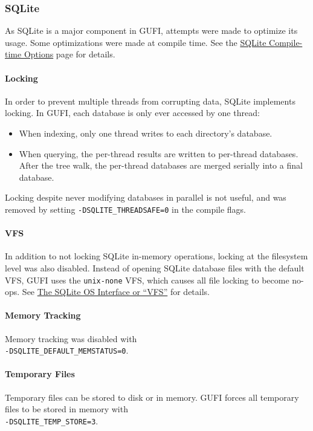 \subsubsection{SQLite}
As SQLite is a major component in GUFI, attempts were made to optimize
its usage. Some optimizations were made at compile time. See the
\href{https://www.sqlite.org/compile.html}{SQLite Compile-time
  Options} page for details.

\paragraph{Locking}
In order to prevent multiple threads from corrupting data, SQLite
implements locking. In GUFI, each database is only ever accessed by
one thread:

\begin{itemize}
\item When indexing, only one thread writes to each directory's
  database.
\item When querying, the per-thread results are written to per-thread
  databases. After the tree walk, the per-thread databases are merged
  serially into a final database.
\end{itemize}

Locking despite never modifying databases in parallel is not useful,
and was removed by setting \texttt{-DSQLITE\_THREADSAFE=0} in the
compile flags.

\paragraph{VFS}
In addition to not locking SQLite in-memory operations, locking at the
filesystem level was also disabled. Instead of opening SQLite database
files with the default VFS, GUFI uses the \texttt{unix-none} VFS,
which causes all file locking to become no-ops. See
\href{https://www.sqlite.org/vfs.html}{The SQLite OS Interface or
 ``VFS''} for details.

\paragraph{Memory Tracking}
Memory tracking was disabled with \\
\noindent \texttt{-DSQLITE\_DEFAULT\_MEMSTATUS=0}.

\paragraph{Temporary Files}
Temporary files can be stored to disk or in memory. GUFI forces all
temporary files to be stored in memory with \\
\texttt{-DSQLITE\_TEMP\_STORE=3}.

